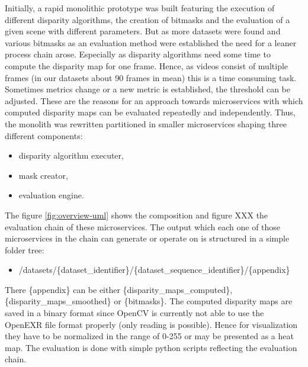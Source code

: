 
\noindent Initially, a rapid monolithic prototype was built featuring the execution of different disparity algorithms, the creation of bitmasks and the evaluation of a given scene with different parameters.
But as more datasets were found and various bitmasks as an evaluation method were established the need for a leaner process chain arose.
Especially as disparity algorithms need some time to compute the disparity map for one frame.
Hence, as videos consist of multiple frames (in our datasets about 90 frames in mean) this is a time consuming task.
Sometimes metrics change or a new metric is established, the threshold can be adjusted.
These are the reasons for an approach towards microservices with which computed disparity maps can be evaluated repeatedly and independently.
Thus, the monolith was rewritten partitioned in smaller microservices shaping three different components:

\begin{itemize}
  \item disparity algorithm executer,
  \item mask creator,
  \item evaluation engine.
\end{itemize}

\noindent The figure \ref{fig:overview-uml} shows the composition and figure XXX the evaluation chain of these microservices.
The output which each one of those microservices in the chain can generate or operate on is structured in a simple folder tree:

\begin{itemize}
  \item /datasets/\{dataset\_identifier\}/\{dataset\_sequence\_identifier\}/\{appendix\}
\end{itemize}

\noindent There \{appendix\} can be either \{disparity\_maps\_computed\}, \{disparity\_maps\_smoothed\} or \{bitmasks\}.
\newline\newline\noindent The computed disparity maps are saved in a binary format since OpenCV is currently not able to use the OpenEXR file format properly (only reading is possible).
Hence for visualization they have to be normalized in the range of 0-255 or may be presented as a heat map.
The evaluation is done with simple python scripts reflecting the evaluation chain.

